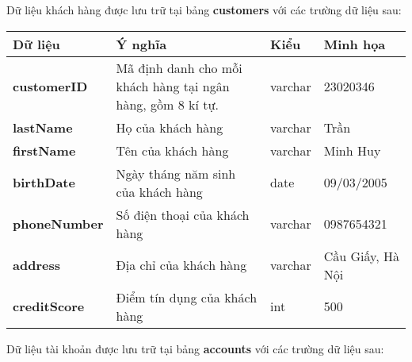 


Dữ liệu khách hàng được lưu trữ tại bảng \textbf{customers} với các trường dữ liệu sau:

\renewcommand{\arraystretch}{2} %
\setlength{\tabcolsep}{10pt}

\begin{center}
    \begin{tabular}{ | m{9em} | m{15em}| m{5em} | m{5em} | } 
    \hline
    \rowcolor{gray!30}
    Dữ liệu & Ý nghĩa & Kiểu & Minh họa \\ 

    \hline
    \textbf{customerID} &
    Mã định danh cho mỗi khách hàng tại ngân hàng, gồm 8 kí tự. &
    varchar &
    23020346 \\

    \hline
    \textbf{lastName} &
    Họ của khách hàng &
    varchar &
    Trần \\

    \hline
    \textbf{firstName} &
    Tên của khách hàng &
    varchar &
    Minh Huy \\

    \hline
    \textbf{birthDate} &
    Ngày tháng năm sinh của khách hàng &
    date &
    09/03/2005\\

    \hline
    \textbf{phoneNumber} &
    Số điện thoại của khách hàng &
    varchar &
    0987654321 \\

    \hline
    \textbf{address} &
    Địa chỉ của khách hàng &
    varchar &
    Cầu Giấy, Hà Nội \\

    \hline
    \textbf{creditScore} &
    Điểm tín dụng của khách hàng &
    int &
    500 \\

    \hline
    \end{tabular}
\end{center}

\noindent
Dữ liệu tài khoản được lưu trữ tại bảng \textbf{accounts} với các trường dữ liệu sau:

